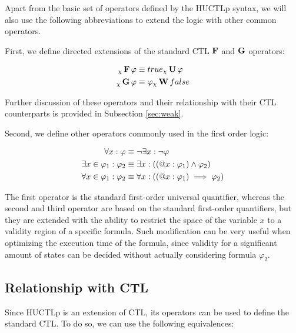 Apart from the basic set of operators defined by the \ac{HUCTLp} syntax, we will also use the following abbreviations to extend the logic with other common operators.

First, we define directed extensions of the standard \ac{CTL} $\operatorname{\mathbf{F}}$ and $\operatorname{\mathbf{G}}$ operators:

\begin{align*}
	{}_{\chi}\operatorname{\mathbf{F}} \varphi 				 & \equiv true {}_{\chi}\operatorname{\mathbf{U}} \varphi \\
	{}_{\chi}\operatorname{\mathbf{G}} \varphi 				& \equiv \varphi {}_{\chi}\operatorname{\mathbf{W}} false \\
\end{align*}

Further discussion of these operators and their relationship with their \ac{CTL} counterparts is provided in Subsection \ref{sec:weak}.

Second, we define other operators commonly used in the first order logic:

\begin{align*}
	\forall x : \varphi 		   		& \equiv \neg \exists x : \neg \varphi \\
	\exists x \in \varphi_1 : \varphi_2 & \equiv \exists x : ((\operatorname{@\!} x : \varphi_1) \land \varphi_2) \\
	\forall x \in \varphi_1 : \varphi_2  & \equiv \forall x : ((\operatorname{@\!} x : \varphi_1) \implies \varphi_2) \\
\end{align*}

The first operator is the standard first-order universal quantifier, whereas the second and third operator are based on the standard first-order quantifiers, but they are extended with the ability to restrict the space of the variable $x$ to a validity region of a specific formula. Such modification can be very useful when optimizing the execution time of the formula, since validity for a significant amount of states can be decided without actually considering formula $\varphi_2$.

\subsection{Relationship with \ac{CTL}}

Since \ac{HUCTLp} is an extension of \ac{CTL}, its operators can be used to define the standard \ac{CTL}. To do so, we can use the following equivalences:

